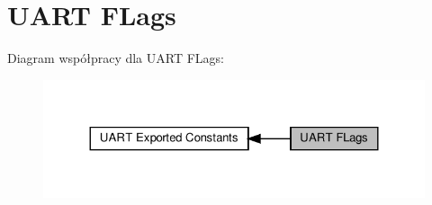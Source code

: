 \hypertarget{group___u_a_r_t___flags}{}\section{U\+A\+RT F\+Lags}
\label{group___u_a_r_t___flags}
Diagram współpracy dla U\+A\+RT F\+Lags\+:\nopagebreak
\begin{figure}[H]
\begin{center}
\leavevmode
\includegraphics[width=324pt]{group___u_a_r_t___flags}
\end{center}
\end{figure}

